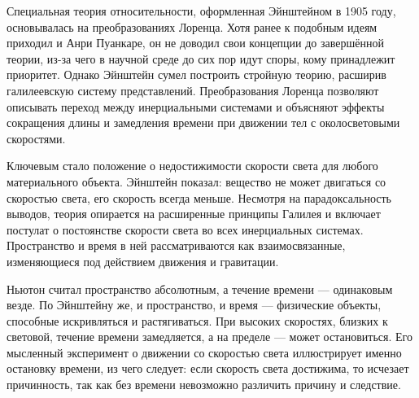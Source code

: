 
Специальная теория относительности, оформленная Эйнштейном в 1905 году, основывалась на преобразованиях Лоренца. Хотя ранее к подобным идеям приходил и Анри Пуанкаре, он не доводил свои концепции до завершённой теории, из-за чего в научной среде до сих пор идут споры, кому принадлежит приоритет. Однако Эйнштейн сумел построить стройную теорию, расширив галилеевскую систему представлений. Преобразования Лоренца позволяют описывать переход между инерциальными системами и объясняют эффекты сокращения длины и замедления времени при движении тел с околосветовыми скоростями.

Ключевым стало положение о недостижимости скорости света для любого материального объекта. Эйнштейн показал: вещество не может двигаться со скоростью света, его скорость всегда меньше. Несмотря на парадоксальность выводов, теория опирается на расширенные принципы Галилея и включает постулат о постоянстве скорости света во всех инерциальных системах. Пространство и время в ней рассматриваются как взаимосвязанные, изменяющиеся под действием движения и гравитации.

Ньютон считал пространство абсолютным, а течение времени --- одинаковым везде. По Эйнштейну же, и пространство, и время --- физические объекты, способные искривляться и растягиваться. При высоких скоростях, близких к световой, течение времени замедляется, а на пределе --- может остановиться. Его мысленный эксперимент о движении со скоростью света иллюстрирует именно остановку времени, из чего следует: если скорость света достижима, то исчезает причинность, так как без времени невозможно различить причину и следствие.

